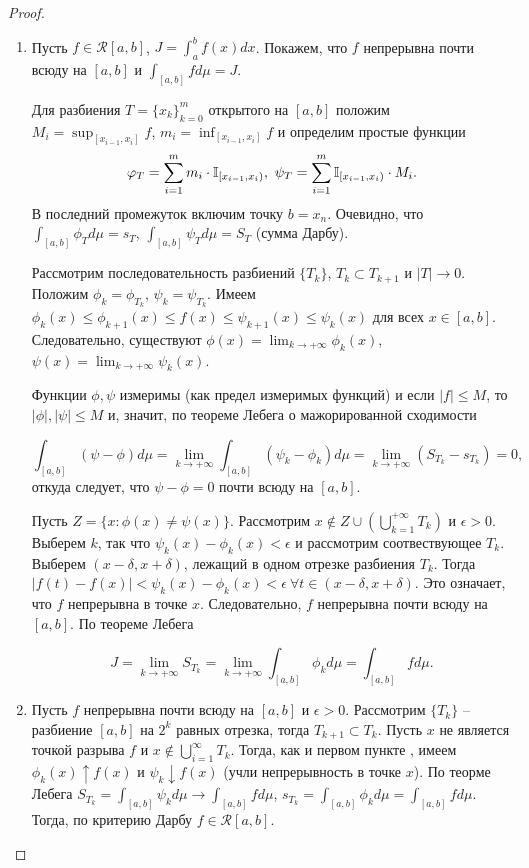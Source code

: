 \begin{proof}
    \begin{enumerate}
        \item Пусть $f \in \mathcal{R}[a, b]$, $ J= \int_{a}^{b}f(x) dx$. Покажем, что $f$ непрерывна почти всюду на $[a, b]$ и $\int_{[a, b]}f d\mu = J$.
        
        Для разбиения $T = \{x_{k}\}_{k = 0}^{m}$ открытого на $[a, b]$ положим $M_{i} = \sup_{[x_{i-1}, x_{i}]} f$, $m_{i} = \inf_{[x_{i-1}, x_{i}]}f$ и определим простые функции 
        \[\varphi_{T} = \sum_{i=1}^{m}m_{i}\cdot \mathbb{I}_{[x_{i-1}, x_{i})}, \ \psi_{T} = \sum_{i=1}^{m}\mathbb{I}_{[x_{i-1}, x_{i})} \cdot M_{i}.\]
        В последний промежуток включим точку $b = x_{n}$. Очевидно, что $\int_{[a, b]} \phi_{T} d\mu = s_{T}$, $\int_{[a, b]} \psi_{T} d\mu = S_{T}$ (сумма Дарбу). 
        
        Рассмотрим последовательность разбиений $\{T_{k}\}$, $T_{k} \subset T_{k+1}$ и $|T| \to 0$. Положим $\phi_{k} = \phi_{T_{k}}$, $\psi_{k} = \psi_{T_{k}}$. Имеем $\phi_{k}(x) \leq \phi_{k+1}(x) \leq f(x) \leq \psi_{k+1}(x) \leq \psi_{k}(x)$ для всех $x \in [a, b]$. Следовательно, существуют $\phi(x) = \lim_{k \to +\infty}\phi_{k}(x)$, $\psi(x) = \lim_{k \to +\infty}\psi_{k}(x)$.
        
        Функции $\phi, \psi$ измеримы (как предел измеримых функций) и если $|f| \leq M$, то $|\phi|, |\psi| \leq M$ и, значит, по теореме Лебега о мажорированной сходимости
        
        \[\int_{[a, b]}(\psi - \phi) d\mu = \lim_{k \to +\infty} \int_{[a, b]}(\psi_{k} - \phi_{k}) d\mu = \lim_{k \to +\infty}(S_{T_{k}} - s_{T_{k}}) = 0,\]
        откуда следует, что $\psi - \phi = 0$ почти всюду на $[a, b]$.
        
        Пусть $Z = \{x : \phi (x) \neq \psi (x) \}$. Рассмотрим $x \not\in Z \cup (\bigcup_{k=1}^{+\infty}T_{k})$ и $\epsilon > 0$. Выберем $k$, так что $\psi_{k}(x) - \phi_{k}(x) < \epsilon$ и рассмотрим соотвествующее $T_{k}$. Выберем $(x - \delta, x + \delta)$, лежащий в одном отрезке разбиения $T_{k}$. Тогда $|f(t)-f(x)| < \psi_{k}(x) - \phi_{k}(x) < \epsilon \ \forall t \in (x - \delta, x + \delta)$. Это означает, что $f$ непрерывна в точке $x$. Следовательно, $f$ непрерывна почти всюду на $[a, b]$. По теореме Лебега
        
        \[J = \lim_{k \to + \infty}S_{T_{k}} = \lim_{k \to + \infty} \int_{[a, b]}\phi_{k} d\mu = \int_{[a, b]}f d\mu.\]
        
        \item Пусть $f$ непрерывна почти всюду на $[a, b]$ и $\epsilon > 0$. Рассмотрим $\{T_{k}\}$ -- разбиение $[a, b]$ на $2^{k}$ равных отрезка, тогда $T_{k + 1} \subset T_{k}$. Пусть $x$ не является точкой разрыва $f$ и $x \not\in \bigcup_{i=1}^{\infty}{T_{k}}$. Тогда, как и первом пункте , имеем $\phi_{k}(x) \uparrow f(x)$ и $\psi_{k} \downarrow f(x)$ (учли непрерывность в точке $x$). По теорме Лебега $S_{T_{k}} = \int_{[a, b]}\psi_{k} d\mu \to \int_{[a, b]}f d\mu$, $s_{T_{k}} = \int_{[a, b]}\phi_{k} d\mu = \int_{[a, b]}f d\mu$. Тогда, по критерию Дарбу $f \in \mathcal{R}[a, b]$.
    \end{enumerate}
\end{proof}